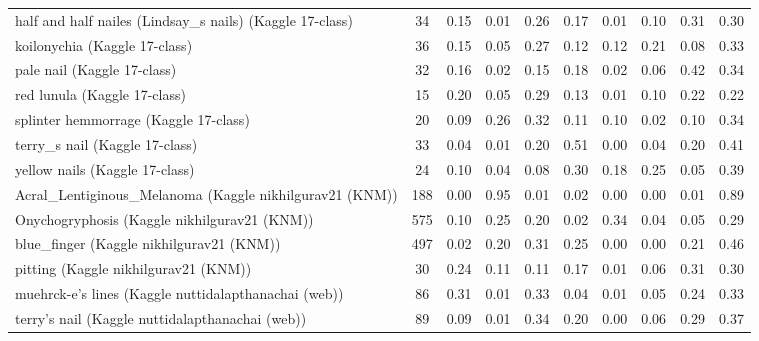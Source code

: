 \begin{table}[!tbp]
\begin{tabular}{lccccccccc}
half and half nailes (Lindsay\_s nails) (Kaggle 17-class) & 34 & 0.15 & 0.01 & 0.26 & 0.17 & 0.01 & 0.10 & 0.31 & 0.30 \\
koilonychia (Kaggle 17-class) & 36 & 0.15 & 0.05 & 0.27 & 0.12 & 0.12 & 0.21 & 0.08 & 0.33 \\
pale nail (Kaggle 17-class) & 32 & 0.16 & 0.02 & 0.15 & 0.18 & 0.02 & 0.06 & 0.42 & 0.34 \\
red lunula (Kaggle 17-class) & 15 & 0.20 & 0.05 & 0.29 & 0.13 & 0.01 & 0.10 & 0.22 & 0.22 \\
splinter hemmorrage (Kaggle 17-class) & 20 & 0.09 & 0.26 & 0.32 & 0.11 & 0.10 & 0.02 & 0.10 & 0.34 \\
terry\_s nail (Kaggle 17-class) & 33 & 0.04 & 0.01 & 0.20 & 0.51 & 0.00 & 0.04 & 0.20 & 0.41 \\
yellow nails (Kaggle 17-class) & 24 & 0.10 & 0.04 & 0.08 & 0.30 & 0.18 & 0.25 & 0.05 & 0.39 \\
Acral\_Lentiginous\_Melanoma (Kaggle nikhilgurav21 (KNM)) & 188 & 0.00 & 0.95 & 0.01 & 0.02 & 0.00 & 0.00 & 0.01 & 0.89 \\
Onychogryphosis (Kaggle nikhilgurav21 (KNM)) & 575 & 0.10 & 0.25 & 0.20 & 0.02 & 0.34 & 0.04 & 0.05 & 0.29 \\
blue\_finger (Kaggle nikhilgurav21 (KNM)) & 497 & 0.02 & 0.20 & 0.31 & 0.25 & 0.00 & 0.00 & 0.21 & 0.46 \\
pitting (Kaggle nikhilgurav21 (KNM)) & 30 & 0.24 & 0.11 & 0.11 & 0.17 & 0.01 & 0.06 & 0.31 & 0.30 \\
muehrck-e's lines (Kaggle nuttidalapthanachai (web)) & 86 & 0.31 & 0.01 & 0.33 & 0.04 & 0.01 & 0.05 & 0.24 & 0.33 \\
terry's nail (Kaggle nuttidalapthanachai (web)) & 89 & 0.09 & 0.01 & 0.34 & 0.20 & 0.00 & 0.06 & 0.29 & 0.37 \\
\hline
\end{tabular}
\end{table}